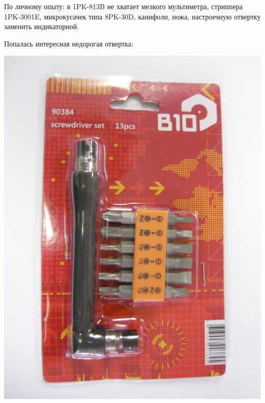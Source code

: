 \documentclass{magazine}
\begin{document}
{По личному опыту: в 1PK-813B не хватает мелкого мультиметра, стриппера
1PK-3001E, микрокусачек типа 8PK-30D, канифоли, ножа, настроечную 
отвертку заменить
индикаторной.


Попалась интересная недорогая отвертка:

\noindent\includegraphics[width=\columnwidth]{fig/00/P1020966.jpg}

}
\end{document}
